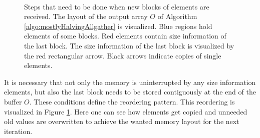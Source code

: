 \begin{figure}[htb]
\begin{minipage}{0.7\textwidth}
\\
	\end{minipage}
	\caption{Steps that need to be done when new blocks of elements are received. The layout of the output array $O$ of Algorithm \ref{algo:mostlyHalvingAllgather} is visualized. Blue regions hold elements of some blocks. Red elements contain size information of the last block. The size information of the last block is visualized by the red rectangular arrow. Black arrows indicate copies of single elements.}
	\label{fig:reorderingMostlyHalvingAlgo}
\end{figure}
It is necessary that not only the memory is uninterrupted by any size information elements, but also the last block needs to be stored contiguously at the end of the buffer $O$. These conditions define the reordering pattern. This reordering is visualized in Figure \ref{fig:reorderingMostlyHalvingAlgo}. Here one can see how elements get copied and unneeded old values are overwritten to achieve the wanted memory layout for the next iteration. 

